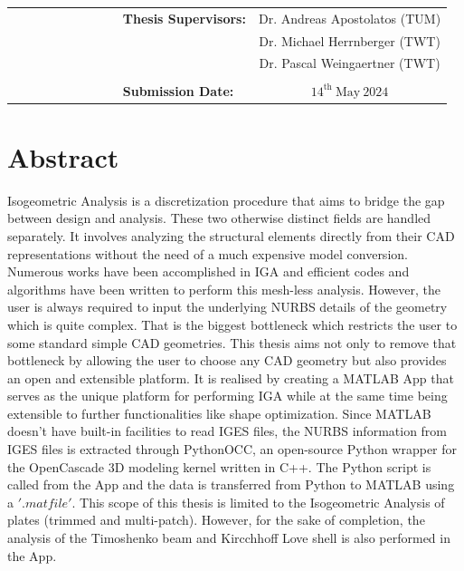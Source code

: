 \documentclass[12pt, a4paper]{report}
\begin{document}
\begin{titlepage}
    \begin{minipage}{0.8\textwidth}
        \begin{tabular}{@{}l c}
            \normalsize{\textbf{~~~~~~~~~~~~~~~Thesis Supervisors:}} & \normalsize{Dr. Andreas Apostolatos (TUM)} \\
                                             & \normalsize{Dr. Michael Herrnberger (TWT)} \\
                                             & \normalsize{Dr. Pascal Weingaertner (TWT)}\\
                                             &\\
            \normalsize{\textbf{~~~~~~~~~~~~~~~Submission Date:}}   & \normalsize{$14^{\text{th}}~\text{May}~2024$}
        \end{tabular}
    \end{minipage}
        \vspace*{\fill} 
\end{titlepage}

\restoregeometry 
{}
\chapter*{Abstract}
Isogeometric Analysis is a discretization procedure that aims to bridge the gap between design and analysis. These two otherwise distinct fields are handled separately. It involves analyzing the structural elements directly from their CAD representations without the need of a much expensive model conversion. Numerous works have been accomplished in IGA and efficient codes and algorithms have been written to perform this mesh-less analysis. However, the user is always required to input the underlying NURBS details of the geometry which is quite complex. That is the biggest bottleneck which restricts the user to some standard simple CAD geometries. This thesis aims not only to remove that bottleneck by allowing the user to choose any CAD geometry but also provides an open and extensible platform. It is realised by creating a MATLAB App that serves as the unique platform for performing IGA while at the same time being extensible to further functionalities like shape optimization. 
\vspace{12pt}
\newline 
Since MATLAB doesn't have built-in facilities to read IGES files, the NURBS information from IGES files is extracted through PythonOCC, an open-source Python wrapper for the OpenCascade 3D modeling kernel written in C++. The Python script is called from the App and the data is transferred from Python to MATLAB using a $'.mat file'$. This scope of this thesis is limited to the Isogeometric Analysis of plates (trimmed and multi-patch). However, for the sake of completion, the analysis of the Timoshenko beam and Kircchhoff Love shell is also performed in the App. 
\end{document}
